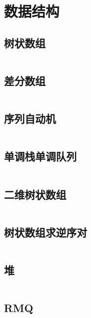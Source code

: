 \inputminted{cpp}{code/有源汇上下界最小流.cc}

\section{数据结构} 
\subsection{树状数组} 

\inputminted{cpp}{code/BIT.cc}

\subsection{差分数组} 

\inputminted{cpp}{code/differenceArray.cc}

\subsection{序列自动机} 

\inputminted{cpp}{code/序列自动机.cc}

\subsection{单调栈单调队列} 

\inputminted{cpp}{code/单调栈单调队列.cc}

\subsection{二维树状数组} 

\inputminted{cpp}{code/2DBIT.cc}

\subsection{树状数组求逆序对} 

\inputminted{cpp}{code/inversionPair.cc}

\subsection{堆} 

\inputminted{cpp}{code/Heap.cc}

\subsection{RMQ} 

